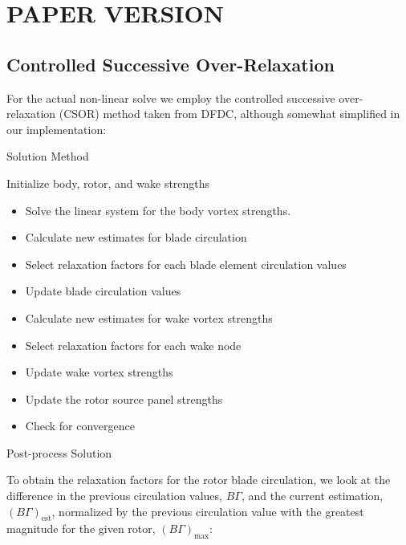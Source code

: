 \section{PAPER VERSION}

\subsection{Controlled Successive Over-Relaxation}
For the actual non-linear solve we employ the controlled successive over-relaxation (CSOR) method taken from DFDC, although somewhat simplified in our implementation:

\begin{algorithm}
\caption{Solution Method}\label{alg:csor}
\begin{algorithmic}
\State Initialize body, rotor, and wake strengths
\begin{itemize}
    \renewcommand\labelitemi{\(\cdot\)}
    \setlength{\itemindent}{1em}
    \item Solve the linear system for the body vortex strengths.
    \item Calculate new estimates for blade circulation 
    \item Select relaxation factors for each blade element circulation values 
    \item Update blade circulation values 
    \item Calculate new estimates for wake vortex strengths 
    \item Select relaxation factors for each wake node 
    \item Update wake vortex strengths 
    \item Update the rotor source panel strengths 
    \item Check for convergence 
\end{itemize}
\EndWhile
\State Post-process Solution
\end{algorithmic}
\end{algorithm}

To obtain the relaxation factors for the rotor blade circulation, we look at the difference in the previous circulation values,
\(B\Gamma\), and the current estimation,
\((B\Gamma)_\text{est}\), normalized by the previous circulation value with the greatest magnitude for the given rotor, \((B\Gamma)_\text{max}\):

